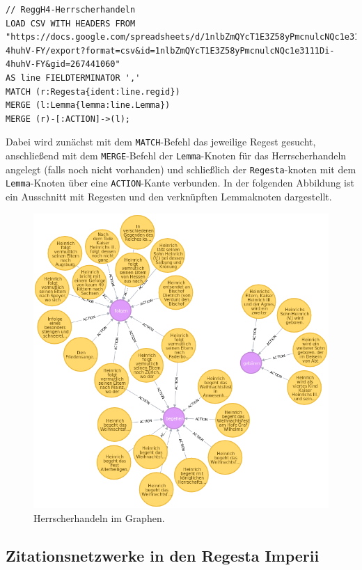 \documentclass[12pt,ngerman,]{article}
\begin{document}
\begin{verbatim}
// ReggH4-Herrscherhandeln
LOAD CSV WITH HEADERS FROM "https://docs.google.com/spreadsheets/d/1nlbZmQYcT1E3Z58yPmcnulcNQc1e3111Di-4huhV-FY/export?format=csv&id=1nlbZmQYcT1E3Z58yPmcnulcNQc1e3111Di-4huhV-FY&gid=267441060"
AS line FIELDTERMINATOR ','
MATCH (r:Regesta{ident:line.regid})
MERGE (l:Lemma{lemma:line.Lemma})
MERGE (r)-[:ACTION]->(l);
\end{verbatim}

Dabei wird zunächst mit dem \texttt{MATCH}-Befehl das jeweilige Regest
gesucht, anschließend mit dem \texttt{MERGE}-Befehl der
\texttt{Lemma}-Knoten für das Herrscherhandeln angelegt (falls noch
nicht vorhanden) und schließlich der \texttt{Regesta}-knoten mit dem
\texttt{Lemma}-Knoten über eine \texttt{ACTION}-Kante verbunden. In der
folgenden Abbildung ist ein Ausschnitt mit Regesten und den verknüpften
Lemmaknoten dargestellt.

\begin{figure}
\centering
\includegraphics{Bilder/RI2Graph/ReggH4-Action.png}
\caption{Herrscherhandeln im Graphen.}
\end{figure}

\subsection{Zitationsnetzwerke in den Regesta
Imperii}\label{zitationsnetzwerke-in-den-regesta-imperii}
\end{document}
